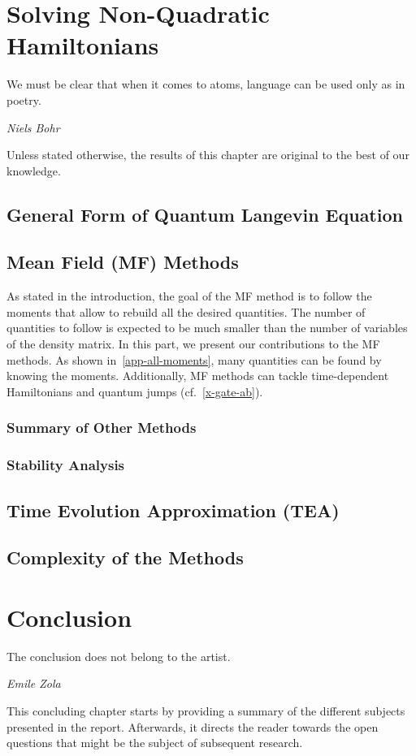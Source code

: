\documentclass[a4paper,11pt,english]{report}
\begin{document}
\chapter{Solving Non-Quadratic Hamiltonians}  \label{main-chapter}
\epigraph{We must be clear that when it comes to atoms, language can be used only as in poetry.}{\textit{Niels Bohr}}
Unless stated otherwise, the results of this chapter are original to the best of our knowledge.
    \section{General Form of Quantum Langevin Equation} \label{find-langevin-gen}
        
    \section{Mean Field (MF) Methods}
        As stated in the introduction, the goal of the MF method is to follow the moments that allow to rebuild all the desired quantities. The number of quantities to follow is expected to be much smaller than the number of variables of the density matrix. In this part, we present our contributions to the MF methods. As shown in~\autoref{app-all-moments}, many quantities can be found by knowing the moments. Additionally, MF methods can tackle time-dependent Hamiltonians and quantum jumps (cf.\@~\autoref{x-gate-ab}).
        \subsection{Summary of Other Methods}
            
        \subsection{Stability Analysis}
            
    \section{Time Evolution Approximation (TEA)} \label{meth-tea}
        
    \section{Complexity of the Methods} \label{comp-methds}
        

\chapter{Conclusion} \label{cc-chapter}
\epigraph{The conclusion does not belong to the artist.}{\textit{Emile Zola}}
This concluding chapter starts by providing a summary of the different subjects presented in the report. Afterwards, it directs the reader towards the open questions that might be the subject of subsequent research.\\
\end{document}
